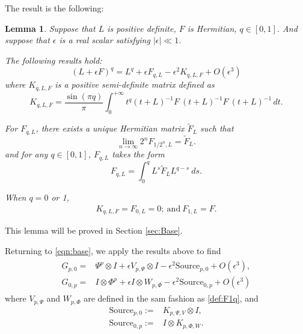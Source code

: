 \documentclass{article}
\numberwithin{equation}{section}
\newtheorem{lemma}[theorem]{Lemma}
\begin{document}
The result is the following:
\begin{lemma}\label{LM:base}
Suppose that $L$ is positive definite, $F$ is Hermitian, $q\in [0,1]$. 
And suppose that $\epsilon$ is a real scalar satisfying $|\epsilon|\ll 1$.

The following results hold:
  \begin{equation}\label{eqn:Vp1}
    (L + \epsilon F)^q = L^q + \epsilon F_{q,L} -\epsilon^2 K_{q,L,F}+O(\epsilon^3)
\end{equation}
where $K_{q,L,F}$ is a positive semi-definite matrix defined as
\begin{equation*}
    K_{q,L,F} = \frac{\sin(\pi q)}{\pi} \int_{0}^{+\infty} t^{q} (t + L)^{-1} F\ (t + L)^{-1} F \ (t + L)^{-1} \, dt.
\end{equation*}

For $F_{q,L}$, there exists a unique Hermitian matrix $\widetilde{F}_{L}$ such that
\begin{equation}
    \lim_{n \to \infty} 2^n F_{1/2^n,L} = \widetilde{F}_{L}.
\end{equation}
and for any $q\in [0,1]$, $F_{q,L}$ takes the form
\begin{equation}\label{def:F1q}
    F_{q,L} = \int_0^q L^s \widetilde{F}_{L} L^{q-s}\ ds.
\end{equation}





When $q=0$ or 1,
\begin{align}\label{eq:q01}
K_{q,L,F}=  F_{0,L}=0;\ \text{and}\ 
F_{1,L}=F.
\end{align}
\end{lemma}
This lemma will be proved in Section \ref{sec:Base}.

Returning to \eqref{eqn:base}, we apply the results above to find
\begin{align}\label{eq:baseEqui}
\begin{split}
G_{p,0} =& \Psi^p \otimes I + \epsilon V_{p,\Psi} \otimes I - \epsilon^2 \text{Source}_{p,0} + O(\epsilon^3),\\
G_{0,p} =& I \otimes \Phi^p + \epsilon I \otimes W_{p,\Phi} - \epsilon^2 \text{Source}_{0,p} + O(\epsilon^3)
\end{split}  
\end{align}
where  $V_{p,\Psi}$ and $W_{p,\Phi}$ are defined in the sam fashion as \eqref{def:F1q}, and
\begin{align*}
\text{Source}_{p,0} :=& K_{p,\Psi,V} \otimes I,\\
\text{Source}_{0,p} :=&  I \otimes K_{p,\Phi,W}.
\end{align*}
\end{document}
